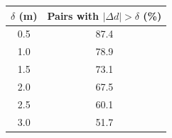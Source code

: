 \begin{tabular}{cc}
\toprule
$\delta$ (m) & Pairs with $|\Delta d|>\delta$ (\%) \\
\midrule
0.5 & 87.4 \\
1.0 & 78.9 \\
1.5 & 73.1 \\
2.0 & 67.5 \\
2.5 & 60.1 \\
3.0 & 51.7 \\
\bottomrule
\end{tabular}
